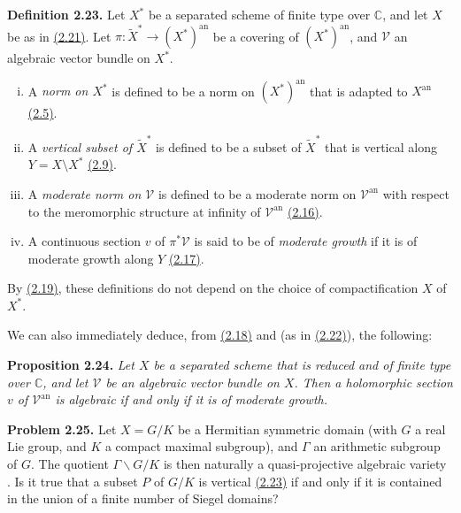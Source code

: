 \documentclass{report}
\newenvironment{itenv}[1]
  {\phantomsection\par\medskip\noindent\textbf{#1.}\itshape}
  {\medskip}
\newenvironment{rmenv}[1]
  {\phantomsection\par\medskip\noindent\textbf{#1.}\rmfamily}
  {\medskip}
\renewcommand{\cal}[1]{{\mathcal{#1}}}
\newcommand{\CC}{\mathbb{C}}
\newcommand{\an}{\mathrm{an}}
\newcommand{\oldpage}[1]{\marginpar{\footnotesize$\Big\vert$ \textit{p.~#1}}}
\begin{document}
\begin{rmenv}{Definition 2.23}
\label{II.2.23}
  Let $X^*$ be a separated scheme of finite type over $\CC$, and let $X$ be as in \hyperref[II.2.21]{(2.21)}.
  Let $\pi\colon\widetilde{X}^*\to(X^*)^\an$ be a covering of $(X^*)^\an$, and $\cal{V}$ an
\oldpage{71}
  algebraic vector bundle on $X^*$.
  \begin{enumerate}[(i)]
    \item A \emph{norm on $X^*$} is defined to be a norm on $(X^*)^\an$ that is adapted to $X^\an$ \hyperref[II.2.5]{(2.5)}.
    \item A \emph{vertical subset of $\widetilde{X}^*$} is defined to be a subset of $\widetilde{X}^*$ that is vertical along $Y=X\setminus X^*$ \hyperref[II.2.9]{(2.9)}.
    \item A \emph{moderate norm on $\cal{V}$} is defined to be a moderate norm on $\cal{V}^\an$ with respect to the meromorphic structure at infinity of $\cal{V}^\an$ \hyperref[II.2.16]{(2.16)}.
    \item A continuous section $v$ of $\pi^*\cal{V}$ is said to be of \emph{moderate growth} if it is of moderate growth along $Y$ \hyperref[II.2.17]{(2.17)}.
  \end{enumerate}
\end{rmenv}

By \hyperref[II.2.19]{(2.19)}, these definitions do not depend on the choice of compactification $X$ of $X^*$.

We can also immediately deduce, from \hyperref[II.2.18]{(2.18)} and \cite{GAGA} (as in \hyperref[II.2.22]{(2.22)}), the following:

\begin{itenv}{Proposition 2.24}
\label{II.2.24}
  Let $X$ be a separated scheme that is reduced and of finite type over $\CC$, and let $\cal{V}$ be an algebraic vector bundle on $X$.
  Then a holomorphic section $v$ of $\cal{V}^\an$ is algebraic if and only if it is of moderate growth.
\end{itenv}

\begin{rmenv}{Problem 2.25}
\label{II.2.25}
  Let $X=G/K$ be a Hermitian symmetric domain (with $G$ a real Lie group, and $K$ a compact maximal subgroup), and $\Gamma$ an arithmetic subgroup of $G$.
  The quotient $\Gamma\backslash G/K$ is then naturally a quasi-projective algebraic variety \cite{2}.
  Is it true that a subset $P$ of $G/K$ is vertical \hyperref[II.2.23]{(2.23)} if and only if it is contained in the union of a finite number of Siegel domains?
\end{rmenv}
\end{document}
